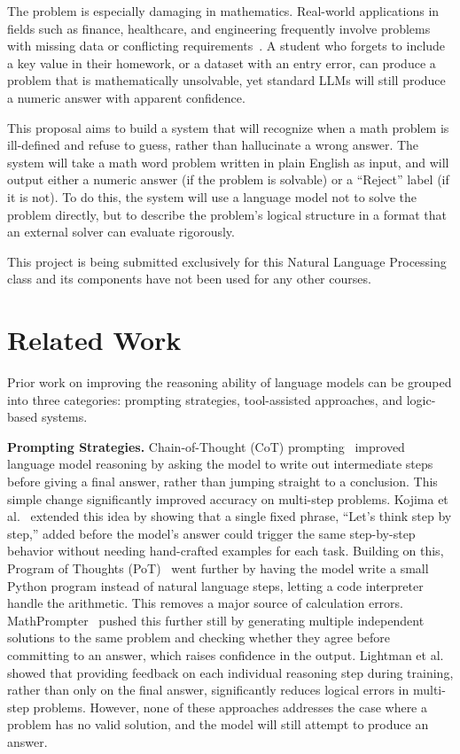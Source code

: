 \documentclass[sigconf, nonacm, onecolumn]{acmart}
\begin{document}
The problem is especially damaging in mathematics. Real-world applications in fields such
as finance, healthcare, and engineering frequently involve problems with missing data or
conflicting requirements~\cite{puchalska1987}. A student who forgets to include a key
value in their homework, or a dataset with an entry error, can produce a problem that is
mathematically unsolvable, yet standard LLMs will still produce a numeric answer with
apparent confidence.

This proposal aims to build a system that will recognize when a math problem is
ill-defined and refuse to guess, rather than hallucinate a wrong answer. The system will
take a math word problem written in plain English as input, and will output either a
numeric answer (if the problem is solvable) or a ``Reject'' label (if it is not). To do
this, the system will use a language model not to solve the problem directly, but to
describe the problem's logical structure in a format that an external solver can evaluate
rigorously.

This project is being submitted exclusively for this Natural Language Processing class and
its components have not been used for any other courses.

\section{Related Work}

Prior work on improving the reasoning ability of language models can be grouped into three
categories: prompting strategies, tool-assisted approaches, and logic-based systems.

\textbf{Prompting Strategies.} Chain-of-Thought (CoT) prompting~\cite{wei2022} improved
language model reasoning by asking the model to write out intermediate steps before giving
a final answer, rather than jumping straight to a conclusion. This simple change
significantly improved accuracy on multi-step problems. Kojima et al.~\cite{kojima2022}
extended this idea by showing that a single fixed phrase, ``Let's think step by step,''
added before the model's answer could trigger the same step-by-step behavior without
needing hand-crafted examples for each task. Building on this, Program of Thoughts
(PoT)~\cite{chen2023} went further by having the model write a small Python program
instead of natural language steps, letting a code interpreter handle the arithmetic. This
removes a major source of calculation errors. MathPrompter~\cite{imani2023} pushed this
further still by generating multiple independent solutions to the same problem and
checking whether they agree before committing to an answer, which raises confidence in the
output. Lightman et al.~\cite{lightman2024} showed that providing feedback on each
individual reasoning step during training, rather than only on the final answer,
significantly reduces logical errors in multi-step problems. However, none of these
approaches addresses the case where a problem has no valid solution, and the model will
still attempt to produce an answer.
\end{document}
